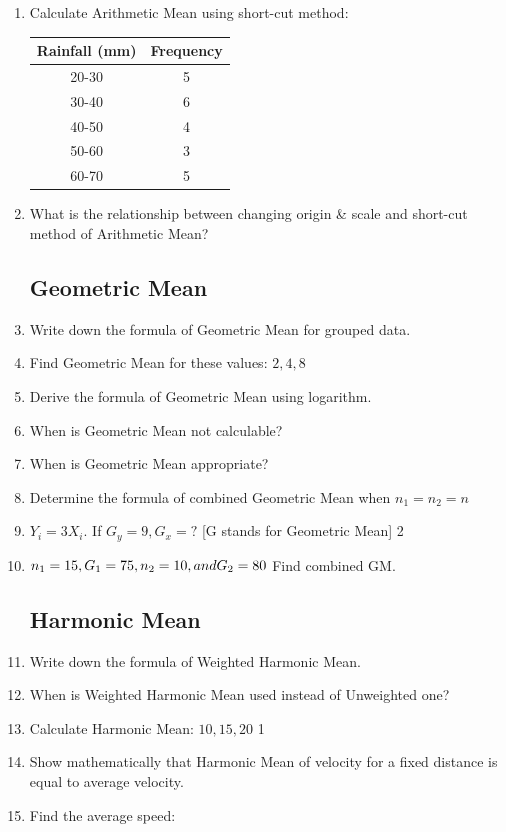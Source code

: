 \documentclass[a4paper,oneside]{book}
\begin{document}
\begin{enumerate}
    \item Calculate Arithmetic Mean using short-cut method:
    
    \begin{table}[h]
    \centering
\begin{tabular}{c|c}
\textbf{Rainfall (mm)} & \textbf{Frequency} \\ \hline
20-30                  & 5                  \\ \hline
30-40                  & 6                  \\ \hline
40-50                  & 4                  \\ \hline
50-60                  & 3                  \\
60-70                  & 5                 
\end{tabular}
\end{table}

    \item What is the relationship between changing origin \& scale and short-cut method of Arithmetic Mean?

\subsection{Geometric Mean}    
    \item Write down the formula of Geometric Mean for grouped data.
    \item Find Geometric Mean for these values: $2, 4, 8$
    \item Derive the formula of Geometric Mean using logarithm.
    \item When is Geometric Mean not calculable?
    \item When is Geometric Mean appropriate?
    \item Determine the formula of combined Geometric Mean when $n_1=n_2=n$
    \item $Y_i = 3X_i$. If $G_y = 9, G_x=?$ [G stands for Geometric Mean] \hfill 2
    \item $n_1=15, G_1=75, n_2=10, \space and \space G_2=80$ Find combined GM.

\subsection{Harmonic Mean}

    \item Write down the formula of Weighted Harmonic Mean.
    \item When is Weighted Harmonic Mean used instead of Unweighted one?
    \item Calculate Harmonic Mean: $10,15,20$ \hfill 1
    \item Show mathematically that Harmonic Mean of velocity for a fixed distance is equal to average velocity.
    \item Find the average speed:
    

\end{enumerate}
\end{document}
